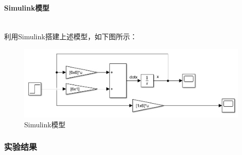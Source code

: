 \documentclass[UTF8]{article}
\begin{document}
\paragraph{Simulink模型}~{}
\\
利用Simulink搭建上述模型，如下图所示：
\begin{figure}[H]
    \centering %
    \includegraphics[width=.8\textwidth]{figure/exp1_1_model.png} 
    \caption{Simulink模型} %
\end{figure}

\subsubsection{实验结果}
\end{document}
